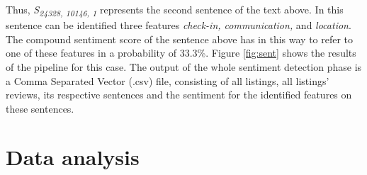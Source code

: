 Thus, \textit{S\textsubscript{24328, 10146, 1}} represents the second sentence of the text above. In this sentence can be identified three features \textit{check-in, communication,} and \textit{location}. The compound sentiment score of the sentence above has in this way to refer to one of these features in a probability of 33.3\%. Figure \ref{fig:sent} shows the results of the pipeline for this case. The output of the whole sentiment detection phase is a Comma Separated Vector (.csv) file, consisting of all listings, all listings' reviews, its respective sentences and the sentiment for the identified features on these sentences. 

%

\section{Data analysis}

% 
%
